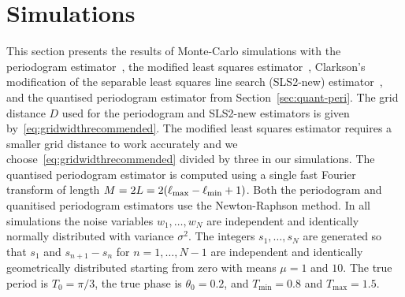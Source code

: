 \documentclass[10pt,twocolumn,twoside]{IEEEtran}
\begin{document}
\section{Simulations} \label{sec:simulations}

This section presents the results of Monte-Carlo simulations with the periodogram estimator~\cite{Haohuan2013435,Fogel1989_bit_synch_zero_crossings}, the modified least squares estimator~\cite{Clarkson2007,McKilliam2007,Quinn_sparse_noisy_SSP_2012}, Clarkson's modification of the separable least squares line search (SLS2-new) estimator~\cite{Clarkson2007,Sidiropoulos2005}, and the quantised periodogram estimator from Section~\ref{sec:quant-peri}.  The grid distance $D$ used for the periodogram and SLS2-new estimators is given by~\eqref{eq:gridwidthrecommended}.  The modified least squares estimator requires a smaller grid distance to work accurately and we choose~\eqref{eq:gridwidthrecommended} divided by three in our simulations.  The quantised periodogram estimator is computed using a single fast Fourier transform of length $M = 2L = 2(\ell_{\text{max}} - \ell_{\text{min}} + 1)$.  Both the periodogram and quanitised periodogram estimators use the Newton-Raphson method.  In all simulations the noise variables $w_1,\dots,w_N$ are independent and identically normally distributed with variance $\sigma^2$.  The integers $s_1,\dots,s_N$ are generated so that $s_1$ and $s_{n+1} - s_n$ for $n=1,\dots,N-1$ are independent and identically geometrically distributed starting from zero with means $\mu=1$ and $10$.  The true period is $T_0 = \pi/3$, the true phase is $\theta_0 = 0.2$, and $T_{\text{min}} = 0.8$ and $T_{\text{max}} = 1.5$.
\end{document}
